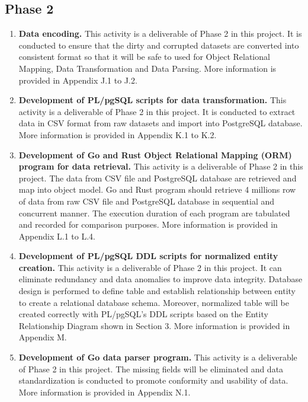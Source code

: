 \subsection{Phase 2}

\begin{enumerate}[topsep=0pt,itemsep=-1ex,partopsep=1ex,parsep=1.5ex]
	
	\item \textbf{Data encoding.}
	This activity is a deliverable of Phase 2 in this project. It is conducted to ensure that the dirty and corrupted datasets are converted into consistent format so that it will be safe to used for Object Relational Mapping, Data Transformation and Data Parsing. More information is provided in Appendix J.1 to J.2. 
	
	\item \textbf{Development of PL/pgSQL scripts for data transformation.} 
	This activity is a deliverable of Phase 2 in this project. It is conducted to extract data in CSV format from raw datasets and import into PostgreSQL database. More information is provided in Appendix K.1 to K.2.
	
	\item \textbf{Development of Go and Rust Object Relational Mapping (ORM) program for data retrieval.}
	This activity is a deliverable of Phase 2 in this project. The data from CSV file and PostgreSQL database are retrieved and map into object model. Go and Rust program should retrieve 4 millions row of data from raw CSV file and PostgreSQL database in sequential and concurrent manner. The execution duration of each program are tabulated and recorded for comparison purposes. 
	More information is provided in Appendix L.1 to L.4.
	
	\item \textbf{Development of PL/pgSQL DDL scripts for normalized entity creation.}
	This activity is a deliverable of Phase 2 in this project. It can eliminate redundancy and data anomalies to improve data integrity. Database design is performed to define table and establish relationship between entity to create a relational database schema. Moreover, normalized table will be created correctly with PL/pgSQL's DDL scripts based on the Entity Relationship Diagram shown in Section 3. More information is provided in Appendix M.
	
	\item \textbf{Development of Go data parser program.}
	This activity is a deliverable of Phase 2 in this project. The missing fields will be eliminated and data standardization is conducted to promote conformity and usability of data. More information is provided in Appendix N.1.
	

\end{enumerate}
